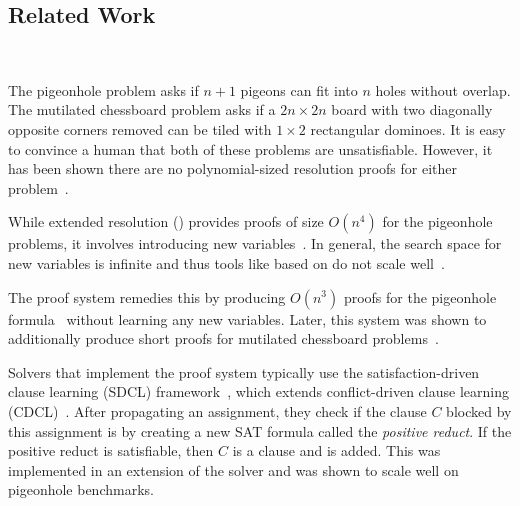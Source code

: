 



\subsection{Related Work}~\label{subsec:relatedwork}

The pigeonhole problem asks if $n+1$ pigeons can fit into $n$ holes without overlap. The
mutilated chessboard problem asks if a $2n \times 2n$ board with two diagonally
opposite corners removed can be tiled with $1 \times 2$ rectangular dominoes.
It is easy to convince a human that both of these problems are unsatisfiable. However, it has
been shown there are no polynomial-sized resolution proofs for either
problem~\cite{hakenpigeonhole,mutilatedchessboard-exponential}.




 While extended resolution (\er) provides proofs of size $O(n^4)$ for the pigeonhole problems, it involves introducing new variables~\cite{er}. In general, the search space for new variables is infinite and thus tools like \glucoser based on \er do not scale well~\cite{glucoser}.

The \pr proof system remedies this by producing $O(n^3)$ proofs for the pigeonhole formula~\cite{prclauses} without learning any new variables. 
Later, this system was shown to additionally produce short proofs for mutilated chessboard problems~\cite{mutilatedchessboard-pr}. 

Solvers that implement the \pr proof system typically use the satisfaction-driven clause learning (SDCL) framework~\cite{sdcl}, which extends conflict-driven clause learning (CDCL)~\cite{cdcl}. 
After propagating an assignment, they check if the clause $C$ blocked by this assignment is \pr by creating a new SAT formula called the \emph{positive reduct}.
If the positive reduct is satisfiable, then $C$ is a \pr clause and is added. 
This was implemented in an extension of the solver \lingeling and was shown to scale well on pigeonhole benchmarks.

